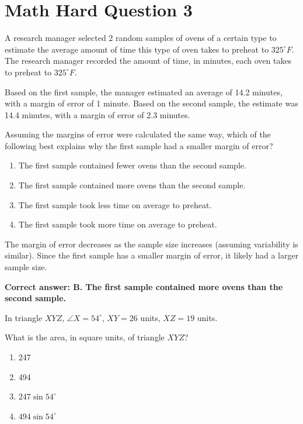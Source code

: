 \documentclass[12pt]{article}
\begin{document}
\section*{Math Hard Question 3}



\begin{tcolorbox}[colback=blue!5!white, colframe=blue!75!black, title=Question]
A research manager selected 2 random samples of ovens of a certain type to estimate the average amount of time this type of oven takes to preheat to $325^\circ F$. The research manager recorded the amount of time, in minutes, each oven takes to preheat to $325^\circ F$.

Based on the first sample, the manager estimated an average of 14.2 minutes, with a margin of error of 1 minute. Based on the second sample, the estimate was 14.4 minutes, with a margin of error of 2.3 minutes.

Assuming the margins of error were calculated the same way, which of the following best explains why the first sample had a smaller margin of error?

\begin{enumerate}
    \item[A.] The first sample contained fewer ovens than the second sample.
    \item[B.] The first sample contained more ovens than the second sample.
    \item[C.] The first sample took less time on average to preheat.
    \item[D.] The first sample took more time on average to preheat.
\end{enumerate}
\end{tcolorbox}

\begin{tcolorbox}[colback=green!10, colframe=green!50!black, title=Answer]
The margin of error decreases as the sample size increases (assuming variability is similar). Since the first sample has a smaller margin of error, it likely had a larger sample size.

\textbf{Correct answer: B. The first sample contained more ovens than the second sample.}
\end{tcolorbox}

\begin{tcolorbox}[colback=blue!5!white, colframe=blue!75!black, title=Question]
In triangle $XYZ$, $\angle X = 54^\circ$, $XY = 26$ units, $XZ = 19$ units.

What is the area, in square units, of triangle $XYZ$?

\begin{enumerate}
    \item[A.] 247
    \item[B.] 494
    \item[C.] $247 \sin 54^\circ$
    \item[D.] $494 \sin 54^\circ$
\end{enumerate}
\end{tcolorbox}
\end{document}
